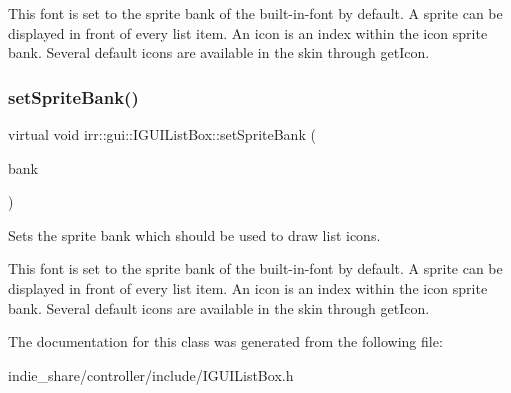 This font is set to the sprite bank of the built-\/in-\/font by default. A sprite can be displayed in front of every list item. An icon is an index within the icon sprite bank. Several default icons are available in the skin through get\+Icon. \mbox{\label{classirr_1_1gui_1_1IGUIListBox_ad139cef6f71bb8d36624b48e8a695ed4}} 
\subsubsection{\texorpdfstring{set\+Sprite\+Bank()}{setSpriteBank()}\hspace{0.1cm}{\footnotesize\ttfamily [2/2]}}
{\footnotesize\ttfamily virtual void irr\+::gui\+::\+I\+G\+U\+I\+List\+Box\+::set\+Sprite\+Bank (\begin{DoxyParamCaption}\item[{\hyperlink{classirr_1_1gui_1_1IGUISpriteBank}{I\+G\+U\+I\+Sprite\+Bank} $\ast$}]{bank }\end{DoxyParamCaption})\hspace{0.3cm}{\ttfamily [pure virtual]}}



Sets the sprite bank which should be used to draw list icons. 

This font is set to the sprite bank of the built-\/in-\/font by default. A sprite can be displayed in front of every list item. An icon is an index within the icon sprite bank. Several default icons are available in the skin through get\+Icon. 

The documentation for this class was generated from the following file\+:\begin{DoxyCompactItemize}
\item 
indie\+\_\+share/controller/include/I\+G\+U\+I\+List\+Box.\+h\end{DoxyCompactItemize}
